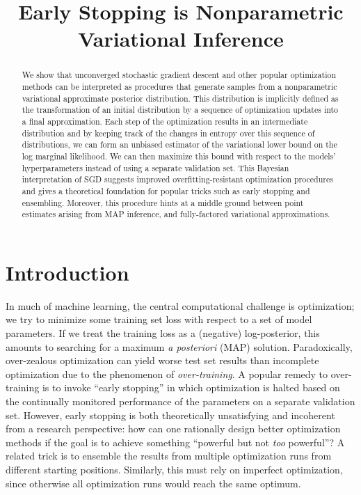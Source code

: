 \documentclass[]{article}
\title{Early Stopping is Nonparametric Variational Inference}
\author{} %
\begin{document}
\maketitle

\begin{abstract}
We show that unconverged stochastic gradient descent and other popular optimization methods can be interpreted as procedures that generate samples from a nonparametric variational approximate posterior distribution.
This distribution is implicitly defined as the transformation of an initial distribution by a sequence of optimization updates into a final approximation.
Each step of the optimization results in an intermediate distribution and by keeping track of the changes in entropy over this sequence of distributions, we can form an unbiased estimator of the variational lower bound on the log marginal likelihood.
We can then maximize this bound with respect to the models' hyperparameters instead of using a separate validation set.
This Bayesian interpretation of SGD suggests improved overfitting-resistant optimization procedures and gives a theoretical foundation for popular tricks such as early stopping and ensembling.
Moreover, this procedure hints at a middle ground between point estimates arising from MAP inference, and fully-factored variational approximations.
\end{abstract}

\section{Introduction}

In much of machine learning, the central computational challenge is optimization; we try to minimize some training set loss with respect to a set of model parameters.
If we treat the training loss as a (negative) log-posterior, this amounts to searching for a maximum \emph{a posteriori} (MAP) solution.
Paradoxically, over-zealous optimization can yield worse test set results than incomplete optimization due to the phenomenon of \emph{over-training}.
A popular remedy to over-training is to invoke ``early stopping'' in which optimization is halted based on the continually monitored performance of the parameters on a separate validation set.
However, early stopping is both theoretically unsatisfying and incoherent from a research perspective: how can one rationally design better optimization methods if the goal is to achieve something ``powerful but not \emph{too} powerful''?
A related trick is to ensemble the results from multiple optimization runs from different starting positions.
Similarly, this must rely on imperfect optimization, since otherwise all optimization runs would reach the same optimum.
\end{document}
